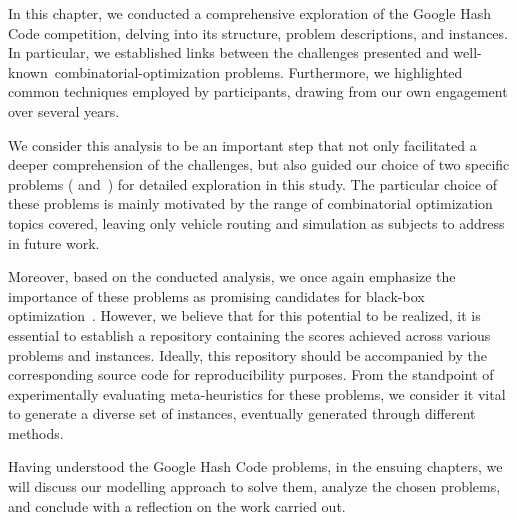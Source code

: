 In this chapter, we conducted a comprehensive exploration of the Google Hash
Code competition, delving into its structure, problem descriptions, and
instances. In particular, we established links between the challenges presented
and well-known~\acrshort{combinatorial-optimization} problems. Furthermore, we
highlighted common techniques employed by participants, drawing from our own
engagement over several years.

We consider this analysis to be an important step that not only facilitated a
deeper comprehension of the challenges, but also guided our choice of two
specific problems (
and~) for detailed exploration in
this study. The particular choice of these problems is mainly motivated by the
range of combinatorial optimization topics covered, leaving only vehicle routing
and simulation as subjects to address in future work.

Moreover, based on the conducted analysis, we once again emphasize the
importance of these problems as promising candidates for black-box
optimization~\cite{bartz-beielstein2020benchmarking}.  However, we believe that
for this potential to be realized, it is essential to establish a repository
containing the scores achieved across various problems and instances. Ideally,
this repository should be accompanied by the corresponding source code for
reproducibility purposes. From the standpoint of experimentally evaluating
meta-heuristics for these problems, we consider it vital to generate a diverse
set of instances, eventually generated through
different methods.

Having understood the Google Hash Code problems, in the ensuing chapters, we
will discuss our modelling approach to solve them, analyze the chosen problems,
and conclude with a reflection on the work carried out.